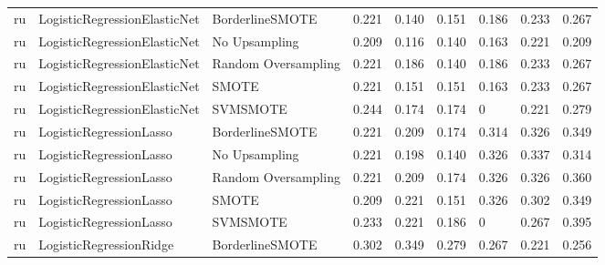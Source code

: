 \begin{tabular}{lllllllll}
      ru & LogisticRegressionElasticNet &     BorderlineSMOTE & 0.221 &                     0.140 &                 0.151 &                  0.186 &                                   0.233 &     0.267 \\
      ru & LogisticRegressionElasticNet &       No Upsampling & 0.209 &                     0.116 &                 0.140 &                  0.163 &                                   0.221 &     0.209 \\
      ru & LogisticRegressionElasticNet & Random Oversampling & 0.221 &                     0.186 &                 0.140 &                  0.186 &                                   0.233 &     0.267 \\
      ru & LogisticRegressionElasticNet &               SMOTE & 0.221 &                     0.151 &                 0.151 &                  0.163 &                                   0.233 &     0.267 \\
      ru & LogisticRegressionElasticNet &            SVMSMOTE & 0.244 &                     0.174 &                 0.174 &                      0 &                                   0.221 &     0.279 \\
      ru &      LogisticRegressionLasso &     BorderlineSMOTE & 0.221 &                     0.209 &                 0.174 &                  0.314 &                                   0.326 &     0.349 \\
      ru &      LogisticRegressionLasso &       No Upsampling & 0.221 &                     0.198 &                 0.140 &                  0.326 &                                   0.337 &     0.314 \\
      ru &      LogisticRegressionLasso & Random Oversampling & 0.221 &                     0.209 &                 0.174 &                  0.326 &                                   0.326 &     0.360 \\
      ru &      LogisticRegressionLasso &               SMOTE & 0.209 &                     0.221 &                 0.151 &                  0.326 &                                   0.302 &     0.349 \\
      ru &      LogisticRegressionLasso &            SVMSMOTE & 0.233 &                     0.221 &                 0.186 &                      0 &                                   0.267 &     0.395 \\
      ru &      LogisticRegressionRidge &     BorderlineSMOTE & 0.302 &                     0.349 &                 0.279 &                  0.267 &                                   0.221 &     0.256 \\

\end{tabular}

